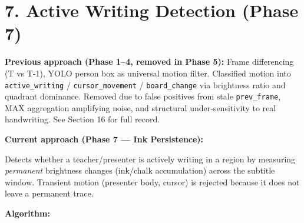 \documentclass[11pt]{article}
\begin{document}
\section*{7. Active Writing Detection (Phase 7)}

\textbf{Previous approach (Phase 1--4, removed in Phase 5):} Frame differencing (T vs T-1), YOLO person box as universal motion filter. Classified motion into \texttt{active\_writing} / \texttt{cursor\_movement} / \texttt{board\_change} via brightness ratio and quadrant dominance. Removed due to false positives from stale \texttt{prev\_frame}, MAX aggregation amplifying noise, and structural under-sensitivity to real handwriting. See Section 16 for full record.

\textbf{Current approach (Phase 7 --- Ink Persistence):}

Detects whether a teacher/presenter is actively writing in a region by measuring \emph{permanent} brightness changes (ink/chalk accumulation) across the subtitle window. Transient motion (presenter body, cursor) is rejected because it does not leave a permanent trace.

\textbf{Algorithm:}
\end{document}
